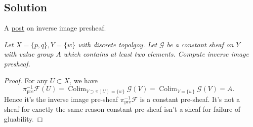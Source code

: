 \subsection{Solution}

A \href{https://math.stackexchange.com/questions/439769/inverse-image-presheaf}{post} on inverse image presheaf.

\textit{Let $X=\{p,q\}, Y=\{w\}$ with discrete topolgoy. Let $\mathscr G$ be a constant sheaf on $Y$ with value group $A$ which contains at least two elements. Compute inverse image presheaf.}
\begin{proof}
	For any $U\subset X$, we have 
	\[\pi_{\text{pre}}^{-1}\mathscr F(U)=\operatorname{Colim}_{V\supset \pi(U)=\{w\}}\mathscr G(V)=\operatorname{Colim}_{V=\{w\}}\mathscr G(V)=A.\]
	Hence it's the inverse image pre-sheaf $\pi_{\text{pre}}^{-1}\mathscr F$ is a constant pre-sheaf. It's not a sheaf for exactly the same reason constant pre-sheaf isn't a sheaf for failure of gluability.
\end{proof}

